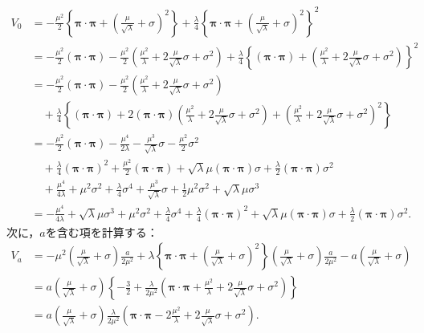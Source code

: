 \begin{align*}
  V_0 &= -\frac{\mu^2}{2} \left\{ \boldsymbol\pi \cdot \boldsymbol\pi + \left( \frac{\mu}{\sqrt{\lambda}} + \sigma\right)^2 \right\}
  + \frac{\lambda}{4} \left\{ \boldsymbol\pi \cdot \boldsymbol\pi + \left( \frac{\mu}{\sqrt{\lambda}} + \sigma\right)^2 \right\}^2 \\
  &= -\frac{\mu^2}{2} (\boldsymbol\pi \cdot \boldsymbol\pi) - \frac{\mu^2}{2} \left( \frac{\mu^2}{\lambda} + 2\frac{\mu}{\sqrt{\lambda}}\sigma + \sigma^2 \right)
  + \frac{\lambda}{4} \left\{ (\boldsymbol\pi \cdot \boldsymbol\pi) + \left( \frac{\mu^2}{\lambda} + 2\frac{\mu}{\sqrt{\lambda}}\sigma + \sigma^2 \right) \right\}^2 \\
  &= -\frac{\mu^2}{2} (\boldsymbol\pi \cdot \boldsymbol\pi) - \frac{\mu^2}{2} \left( \frac{\mu^2}{\lambda} + 2\frac{\mu}{\sqrt{\lambda}}\sigma + \sigma^2 \right) \\
  &\quad + \frac{\lambda}{4} \left\{ (\boldsymbol\pi \cdot \boldsymbol\pi) + 2 (\boldsymbol\pi \cdot \boldsymbol\pi) \left( \frac{\mu^2}{\lambda}
  + 2\frac{\mu}{\sqrt{\lambda}}\sigma + \sigma^2 \right) + \left( \frac{\mu^2}{\lambda} + 2\frac{\mu}{\sqrt{\lambda}}\sigma + \sigma^2 \right)^2 \right\} \\
  &= -\frac{\mu^2}{2} (\boldsymbol\pi \cdot \boldsymbol\pi) - \frac{\mu^4}{2\lambda} - \frac{\mu^3}{\sqrt{\lambda}}\sigma - \frac{\mu^2}{2}\sigma^2 \\
  &\quad + \frac{\lambda}{4}(\boldsymbol\pi \cdot \boldsymbol\pi)^2 + \frac{\mu^2}{2}(\boldsymbol\pi \cdot \boldsymbol\pi) + \sqrt{\lambda}\mu (\boldsymbol\pi \cdot \boldsymbol\pi) \sigma + \frac{\lambda}{2} (\boldsymbol\pi \cdot \boldsymbol\pi) \sigma^2 \\
  &\quad + \frac{\mu^4}{4\lambda} + \mu^2\sigma^2 + \frac{\lambda}{4}\sigma^4 + \frac{\mu^3}{\sqrt{\lambda}}\sigma + \frac{1}{2}\mu^2\sigma^2 + \sqrt{\lambda}\mu\sigma^3 \\
  &= - \frac{\mu^4}{4\lambda} + \sqrt{\lambda}\mu\sigma^3 + \mu^2\sigma^2 + \frac{\lambda}{4}\sigma^4 + \frac{\lambda}{4}(\boldsymbol\pi \cdot \boldsymbol\pi)^2
  + \sqrt{\lambda}\mu (\boldsymbol\pi \cdot \boldsymbol\pi) \sigma + \frac{\lambda}{2} (\boldsymbol\pi \cdot \boldsymbol\pi) \sigma^2 .
\end{align*}
次に，$a$を含む項を計算する：
\begin{align*}
  V_a &= -\mu^2 \left( \frac{\mu}{\sqrt{\lambda}} + \sigma\right)\frac{a}{2\mu^2}
  + \lambda \left\{ \boldsymbol\pi \cdot \boldsymbol\pi + \left( \frac{\mu}{\sqrt{\lambda}} + \sigma\right)^2 \right\} \left( \frac{\mu}{\sqrt{\lambda}} + \sigma\right)\frac{a}{2\mu^2}
  - a \left( \frac{\mu}{\sqrt{\lambda}} + \sigma \right) \\
  &= a \left( \frac{\mu}{\sqrt{\lambda}} + \sigma \right) \left\{ -\frac{3}{2} + \frac{\lambda}{2\mu^2} \left( \boldsymbol\pi \cdot \boldsymbol\pi + \frac{\mu^2}{\lambda} + 2\frac{\mu}{\sqrt{\lambda}}\sigma + \sigma^2 \right) \right\} \\
  &= a \left( \frac{\mu}{\sqrt{\lambda}} + \sigma \right) \frac{\lambda}{2\mu^2} \left( \boldsymbol\pi \cdot \boldsymbol\pi - 2\frac{\mu^2}{\lambda} + 2\frac{\mu}{\sqrt{\lambda}}\sigma + \sigma^2 \right).
\end{align*}
